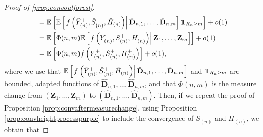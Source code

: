 \begin{proof}[Proof of \cref{prop:convoutforest}]
\begin{align*}
&=\E\left[ \E\left[\left. f\left(\hat{Y}^+_{(n)},\hat{S}^+_{(n)},  \hat{H}_{(n)}\right)\right|\hat{\mathbf{D}}_{n,1},\dots, \hat{\mathbf{D}}_{n,m} \right]\one_{R_n\geq m} \right]+o(1)
 \\&=\E\left[ \Phi(n,m)\E\left[\left.f\left(Y^+_{(n)}, S^+_{(n)},  H^+_{(n)}\right)\right| \mathbf{Z}_1,\dots, \mathbf{Z}_m\right]\right]+o(1)\\&=\E\left[ \Phi(n,m)f\left(Y^+_{(n)},S^+_{(n)},  H^+_{(n)}\right)\right]+o(1),
\end{align*}
where we use that ${\mathbb E}\left[\left. f\left(\hat{Y}^+_{(n)},\hat{S}^+_{(n)},  \hat{H}_{(n)}\right)\right| \hat{\mathbf{D}}_{n,1},\dots, \hat{\mathbf{D}}_{n,m}\right]$ and $\one_{R_n\geq m}$ are bounded, adapted functions of $\hat{\mathbf{D}}_{n,1},\dots, \hat{\mathbf{D}}_{n,m}$, and that $\Phi(n,m)$ is the measure change from  $({\mathbf{Z}}_{1},\dots, {\mathbf{Z}}_{m})$ to $(\hat{\mathbf{D}}_{n,1},\dots, \hat{\mathbf{D}}_{n,m})$.
Then, if we repeat the proof of Proposition \ref{prop:convaftermeasurechange}, using Proposition  \ref{prop:convheightprocesspurple} to include the convergence of $S^+_{(n)}$ and $H^+_{(n)}$, we obtain that 

\end{proof}

